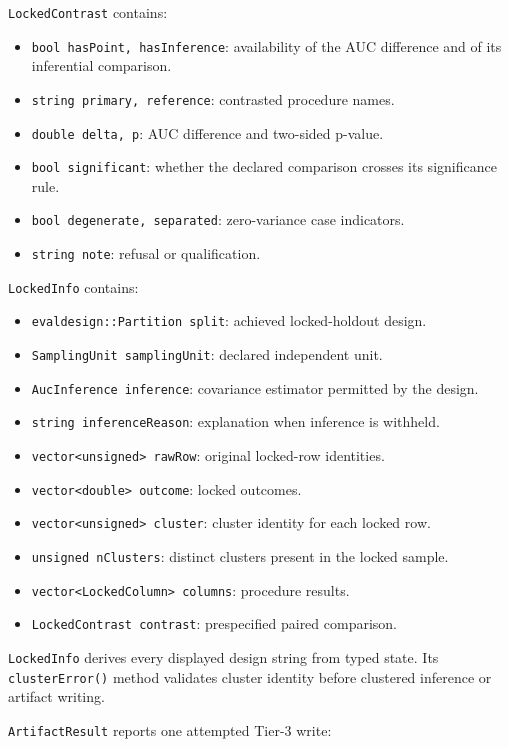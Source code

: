\texttt{LockedContrast} contains:

\begin{itemize}
\item \texttt{bool hasPoint, hasInference}: availability of the AUC difference
      and of its inferential comparison.
\item \texttt{string primary, reference}: contrasted procedure names.
\item \texttt{double delta, p}: AUC difference and two-sided p-value.
\item \texttt{bool significant}: whether the declared comparison crosses its
      significance rule.
\item \texttt{bool degenerate, separated}: zero-variance case indicators.
\item \texttt{string note}: refusal or qualification.
\end{itemize}

\texttt{LockedInfo} contains:

\begin{itemize}
\item \texttt{evaldesign::Partition split}: achieved locked-holdout design.
\item \texttt{SamplingUnit samplingUnit}: declared independent unit.
\item \texttt{AucInference inference}: covariance estimator permitted by the
      design.
\item \texttt{string inferenceReason}: explanation when inference is withheld.
\item \texttt{vector<unsigned> rawRow}: original locked-row identities.
\item \texttt{vector<double> outcome}: locked outcomes.
\item \texttt{vector<unsigned> cluster}: cluster identity for each locked row.
\item \texttt{unsigned nClusters}: distinct clusters present in the locked
      sample.
\item \texttt{vector<LockedColumn> columns}: procedure results.
\item \texttt{LockedContrast contrast}: prespecified paired comparison.
\end{itemize}

\texttt{LockedInfo} derives every displayed design string from typed state.
Its \texttt{clusterError()} method validates cluster identity before clustered
inference or artifact writing.

\texttt{ArtifactResult} reports one attempted Tier-3 write:

